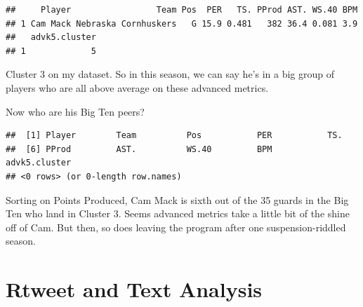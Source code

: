 \documentclass[
]{book}
\newenvironment{Shaded}{\begin{snugshade}}{\end{snugshade}}
\newcommand{\DecValTok}[1]{\textcolor[rgb]{0.00,0.00,0.81}{#1}}
\newcommand{\KeywordTok}[1]{\textcolor[rgb]{0.13,0.29,0.53}{\textbf{#1}}}
\newcommand{\NormalTok}[1]{#1}
\newcommand{\OperatorTok}[1]{\textcolor[rgb]{0.81,0.36,0.00}{\textbf{#1}}}
\newcommand{\StringTok}[1]{\textcolor[rgb]{0.31,0.60,0.02}{#1}}
\begin{document}
\begin{Shaded}
\end{Shaded}

\begin{verbatim}
##     Player                 Team Pos  PER   TS. PProd AST. WS.40 BPM
## 1 Cam Mack Nebraska Cornhuskers   G 15.9 0.481   382 36.4 0.081 3.9
##   advk5.cluster
## 1             5
\end{verbatim}

Cluster 3 on my dataset. So in this season, we can say he's in a big group of players who are all above average on these advanced metrics.

Now who are his Big Ten peers?

\begin{Shaded}
\end{Shaded}

\begin{verbatim}
##  [1] Player        Team          Pos           PER           TS.          
##  [6] PProd         AST.          WS.40         BPM           advk5.cluster
## <0 rows> (or 0-length row.names)
\end{verbatim}

Sorting on Points Produced, Cam Mack is sixth out of the 35 guards in the Big Ten who land in Cluster 3. Seems advanced metrics take a little bit of the shine off of Cam. But then, so does leaving the program after one suspension-riddled season.

\hypertarget{rtweet-and-text-analysis}{%
\chapter{Rtweet and Text Analysis}\label{rtweet-and-text-analysis}}
\end{document}
